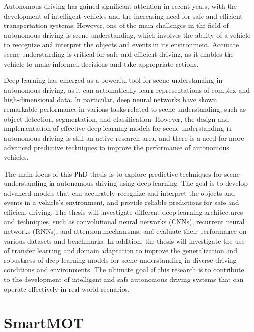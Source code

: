 Autonomous driving has gained significant attention in recent years, with the development of intelligent vehicles and the increasing need for safe and efficient transportation systems. However, one of the main challenges in the field of autonomous driving is scene understanding, which involves the ability of a vehicle to recognize and interpret the objects and events in its environment. Accurate scene understanding is critical for safe and efficient driving, as it enables the vehicle to make informed decisions and take appropriate actions.

Deep learning has emerged as a powerful tool for scene understanding in autonomous driving, as it can automatically learn representations of complex and high-dimensional data. In particular, deep neural networks have shown remarkable performance in various tasks related to scene understanding, such as object detection, segmentation, and classification. However, the design and implementation of effective deep learning models for scene understanding in autonomous driving is still an active research area, and there is a need for more advanced predictive techniques to improve the performance of autonomous vehicles.

The main focus of this PhD thesis is to explore predictive techniques for scene understanding in autonomous driving using deep learning. The goal is to develop advanced models that can accurately recognize and interpret the objects and events in a vehicle's environment, and provide reliable predictions for safe and efficient driving. The thesis will investigate different deep learning architectures and techniques, such as convolutional neural networks (CNNs), recurrent neural networks (RNNs), and attention mechanisms, and evaluate their performance on various datasets and benchmarks. In addition, the thesis will investigate the use of transfer learning and domain adaptation to improve the generalization and robustness of deep learning models for scene understanding in diverse driving conditions and environments. The ultimate goal of this research is to contribute to the development of intelligent and safe autonomous driving systems that can operate effectively in real-world scenarios.

\section{SmartMOT}
\label{sec:4_smartmot}


